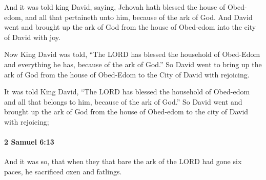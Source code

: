 			\begin{versebox}
					\item[BHS] 
					\item[ASV] And it was told king David, saying, Jehovah hath blessed the house of Obed-edom, and all that pertaineth unto him, because of the ark of God. And David went and brought up the ark of God from the house of Obed-edom into the city of David with joy.
					\item[NIV] Now King David was told, “The LORD has blessed the household of Obed-Edom and everything he has, because of the ark of God.” So David went to bring up the ark of God from the house of Obed-Edom to the City of David with rejoicing.
					\item[NRSV] It was told King David, “The LORD has blessed the household of Obed-edom and all that belongs to him, because of the ark of God.” So David went and brought up the ark of God from the house of Obed-edom to the city of David with rejoicing;
			\end{versebox}

		\paragraph{2 Samuel 6:13} %
			\label{2SAMUEL-6-13}

			And it was so, that when they that bare the ark of the LORD had gone six paces, he sacrificed oxen and fatlings.

